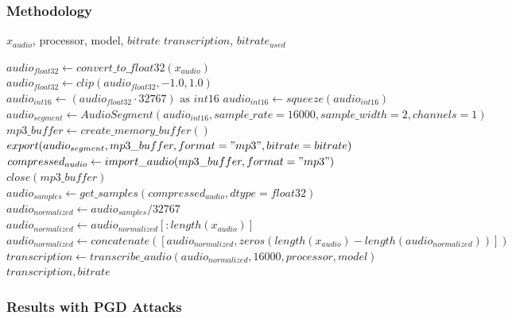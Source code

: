 \documentclass[a4paper,12pt]{article}
\begin{document}
\subsubsection{Methodology}
\begin{algorithm}
\caption{MP3 Compression Defense}
\begin{algorithmic}[1]
\Require $x_{audio}$, processor, model, $bitrate$ 
\Ensure $transcription$, $bitrate_{used}$ 

\State $audio_{float32} \gets convert\_to\_float32(x_{audio})$ 
\State $audio_{float32} \gets clip(audio_{float32}, -1.0, 1.0)$ 
\State $audio_{int16} \gets (audio_{float32} \cdot 32767) \text{ as } int16$ 
    \State $audio_{int16} \gets squeeze(audio_{int16})$ 
\EndIf
\State $audio_{segment} \gets AudioSegment(audio_{int16}, sample\_rate=16000, sample\_width=2, channels=1)$ 
\State $mp3\_buffer \gets create\_memory\_buffer()$ 
\State $export(audio_{segment}, mp3\_buffer, format="mp3", bitrate=bitrate)$ 
\State $compressed_{audio} \gets import\_audio(mp3\_buffer, format="mp3")$ 
\State $close(mp3\_buffer)$ 
\State $audio_{samples} \gets get\_samples(compressed_{audio}, dtype=float32)$ 
\State $audio_{normalized} \gets audio_{samples} / 32767$ 
        \State $audio_{normalized} \gets audio_{normalized}[:length(x_{audio})]$ 
    \Else
        \State $audio_{normalized} \gets concatenate([audio_{normalized}, zeros(length(x_{audio}) - length(audio_{normalized}))])$ 
    \EndIf
\EndIf
\State $transcription \gets transcribe\_audio(audio_{normalized}, 16000, processor, model)$ 
\State \Return $transcription, bitrate$ 
\end{algorithmic}
\end{algorithm}

\newpage


\subsubsection{Results with PGD Attacks}
\end{document}

